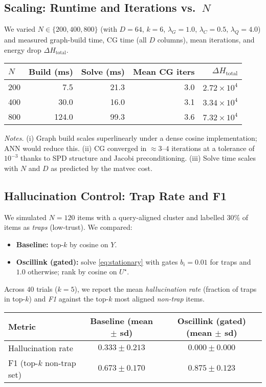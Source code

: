 \documentclass[11pt]{article}
\begin{document}
\subsection{Scaling: Runtime and Iterations vs.\ $N$}
We varied $N\in\{200,400,800\}$ (with $D{=}64$, $k{=}6$, $\lambda_G{=}1.0$, $\lambda_C{=}0.5$, $\lambda_Q{=}4.0$) and measured graph-build time, CG time (all $D$ columns), mean iterations, and energy drop $\Delta H_{\text{total}}$.

\begin{center}
\begin{tabular}{lrrrr}
\toprule
$N$ & Build (ms) & Solve (ms) & Mean CG iters & $\Delta H_{\text{total}}$ \\
\midrule
200 & 7.5 & 21.3 & 3.0 & $2.72{\times}10^4$ \\
400 & 30.0 & 16.0 & 3.1 & $3.34{\times}10^4$ \\
800 & 124.0 & 99.3 & 3.6 & $7.32{\times}10^4$ \\
\bottomrule
\end{tabular}
\end{center}

\noindent
\emph{Notes.} (i) Graph build scales superlinearly under a dense cosine implementation; ANN would reduce this. (ii) CG converged in $\approx 3$--$4$ iterations at a tolerance of $10^{-3}$ thanks to SPD structure and Jacobi preconditioning. (iii) Solve time scales with $N$ and $D$ as predicted by the matvec cost.

\subsection{Hallucination Control: Trap Rate and F1}
We simulated $N{=}120$ items with a query-aligned cluster and labelled $30\%$ of items as \emph{traps} (low-trust). We compared:
\begin{itemize}
  \item \textbf{Baseline:} top-$k$ by cosine on $Y$.
  \item \textbf{Oscillink (gated):} solve \eqref{eq:stationary} with gates $b_i{=}0.01$ for traps and $1.0$ otherwise; rank by cosine on $U^\star$.
\end{itemize}
Across $40$ trials ($k{=}5$), we report the mean \emph{hallucination rate} (fraction of traps in top-$k$) and \emph{F1} against the top-$k$ most aligned \emph{non-trap} items.

\begin{center}
\begin{tabular}{lcc}
\toprule
Metric & Baseline (mean $\pm$ sd) & Oscillink (gated) (mean $\pm$ sd) \\
\midrule
Hallucination rate & $0.333 \pm 0.213$ & $\mathbf{0.000 \pm 0.000}$ \\
F1 (top-$k$ non-trap set) & $0.673 \pm 0.170$ & $\mathbf{0.875 \pm 0.123}$ \\
\bottomrule
\end{tabular}
\end{center}
\end{document}
